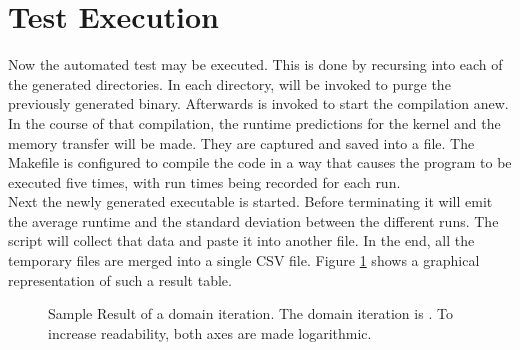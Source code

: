 \section{Test Execution}
\label{sect:results_execution}

Now the automated test may be executed. This is done by recursing into each of the generated directories. In each directory,  will be invoked to purge the previously generated binary. Afterwards  is invoked to start the compilation anew. In the course of that compilation, the runtime predictions for the kernel and the memory transfer will be made. They are captured and saved into a file. The Makefile is configured to compile the code in a way that causes the program to be executed five times, with run times being recorded for each run. \\

Next the newly generated executable is started. Before terminating it will emit the average runtime and the standard deviation between the different runs. The script will collect that data and paste it into another file. In the end, all the temporary files are merged into a single CSV file. Figure \ref{fig:result_automated_sample} shows a graphical representation of such a result table. \\

\begin{figure}[h]
	\begin{center}
		\caption{Sample Result of a domain iteration. The domain iteration is . To increase readability, both axes are made logarithmic.}
		\label{fig:result_automated_sample}
	\end{center}
\end{figure}

